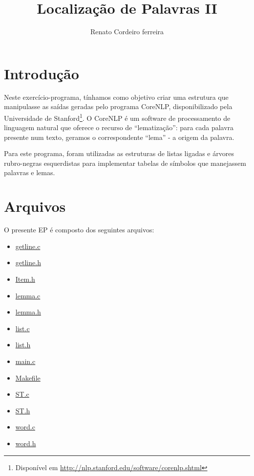 \documentclass[a4paper,12pt]{article}
\title {Localização de Palavras II}
\author{Renato Cordeiro ferreira}
\begin{document}
\newpage %

\maketitle

\section{Introdução} 

    Neste exercício-programa, tínhamos como objetivo criar uma estrutura
    que manipulasse as saídas geradas pelo programa CoreNLP,     
    disponibilizado pela Universidade de Stanford\footnote{Disponível em
    \url{http://nlp.stanford.edu/software/corenlp.shtml}}. O CoreNLP é 
    um software de processamento de linguagem natural que oferece o 
    recurso de ``lematização'': para cada palavra presente num texto,
    geramos o correspondente ``lema'' - a origem da palavra.

    Para este programa, foram utilizadas as estruturas de listas ligadas
    e árvores rubro-negras esquerdistas para implementar tabelas de
    símbolos que manejassem palavras e lemas.

\section{Arquivos} 
    
    O presente EP é composto dos seguintes arquivos:    
    
    \begin{itemize}
      \item \href{run:./getline.c}{getline.c}
      \item \href{run:./getline.h}{getline.h}
      \item \href{run:./Item.h}{Item.h}
      \item \href{run:./lemma.c}{lemma.c}
      \item \href{run:./lemma.h}{lemma.h}
      \item \href{run:./list.c}{list.c}
      \item \href{run:./list.h}{list.h}
      \item \href{run:./main.c}{main.c}
      \item \href{run:./Makefile}{Makefile}
      \item \href{run:./ST.c}{ST.c}
      \item \href{run:./ST.h}{ST.h}
      \item \href{run:./word.c}{word.c}
      \item \href{run:./word.h}{word.h}
    \end{itemize}
    
\end{document}
